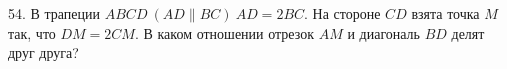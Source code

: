 54. В трапеции $ABCD\ (AD\parallel BC)\ AD=2BC.$ На стороне $CD$ взята точка $M$ так, что $DM=2CM.$ В каком отношении отрезок $AM$ и диагональ $BD$ делят друг друга?\\
